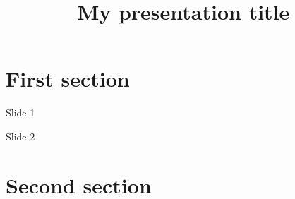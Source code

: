 \documentclass{beamer}
\title[My presentation title]
{My presentation title}
\begin{document}
	\maketitle
	\section{First section}
	\begin{frame}{Slide 1}
	\end{frame}
	\begin{frame}{Slide 2}
	\end{frame}
	\section{Second section}
\end{document}
